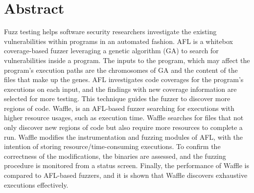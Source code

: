 \doublespacing
\chapter*{Abstract}

Fuzz testing helps software security researchers investigate the existing vulnerabilities within programs in an automated fashion. AFL is a whitebox coverage-based fuzzer leveraging a genetic algorithm (GA) to search for vulnerabilities inside a program. The inputs to the program, which may affect the program's execution paths are the chromosomes of GA and the content of the files that make up the genes. AFL investigates code coverages for the program's executions on each input, and the findings with new coverage information are selected for more testing. This technique guides the fuzzer to discover more regions of code. Waffle, is an AFL-based fuzzer searching for executions with higher resource usages, such as execution time. Waffle searches for files that not only discover new regions of code but also require more resources to complete a run. Waffle modifies the instrumentation and fuzzing modules of AFL, with the intention of storing resource/time-consuming executions. To confirm the correctness of the modifications, the binaries are assessed, and the fuzzing procedure is monitored from a status screen. Finally, the performance of Waffle is compared to AFL-based fuzzers, and it is shown that Waffle discovers exhaustive executions effectively.